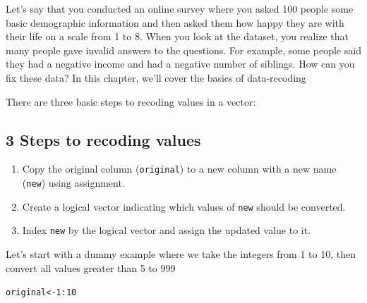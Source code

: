 \documentclass{tufte-book}\usepackage[]{graphicx}\usepackage[]{color}
\makeatletter
\newcommand{\hlnum}[1]{\textcolor[rgb]{0.686,0.059,0.569}{#1}}%
\newcommand{\hlopt}[1]{\textcolor[rgb]{0,0,0}{#1}}%
\newcommand{\hlstd}[1]{\textcolor[rgb]{0.345,0.345,0.345}{#1}}%
\newcommand{\hlkwb}[1]{\textcolor[rgb]{0.69,0.353,0.396}{#1}}%
\newenvironment{kframe}{%
 \def\at@end@of@kframe{}%
 \ifinner\ifhmode%
  \def\at@end@of@kframe{\end{minipage}}%
  \begin{minipage}{\columnwidth}%
 \fi\fi%
 \def\FrameCommand##1{\hskip\@totalleftmargin \hskip-\fboxsep
 \colorbox{shadecolor}{##1}\hskip-\fboxsep
     \hskip-\linewidth \hskip-\@totalleftmargin \hskip\columnwidth}%
 \MakeFramed {\advance\hsize-\width
   \@totalleftmargin\z@ \linewidth\hsize
   \@setminipage}}%
 {\par\unskip\endMakeFramed%
 \at@end@of@kframe}
\newenvironment{knitrout}{}{} %
\makeatother
\begin{document}
\begin{footnotesize}
Let's say that you conducted an online survey where you asked 100 people some basic demographic information and then asked them how happy they are with their life on a scale from 1 to 8. When you look at the dataset, you realize that many people gave invalid answers to the questions. For example, some people said they had a negative income and had a negative number of siblings. How can you fix these data? In this chapter, we'll cover the basics of data-recoding

There are three basic steps to recoding values in a vector:


\subsection{3 Steps to recoding values}

\begin{enumerate}

\item Copy the original column (\texttt{original}) to a new column with a new name (\texttt{new}) using assignment.
\item Create a logical vector indicating which values of \texttt{new} should be converted.
\item Index \texttt{new} by the logical vector and assign the updated value to it.

\end{enumerate}

Let's start with a dummy example where we take the integers from 1 to 10, then convert all values greater than 5 to 999

\begin{knitrout}
\color{fgcolor}\begin{kframe}
\begin{alltt}
\hlstd{original} \hlkwb{<-} \hlnum{1}\hlopt{:}\hlnum{10}


\end{alltt}
\end{kframe}
\end{knitrout}
\end{footnotesize}
\end{document}
